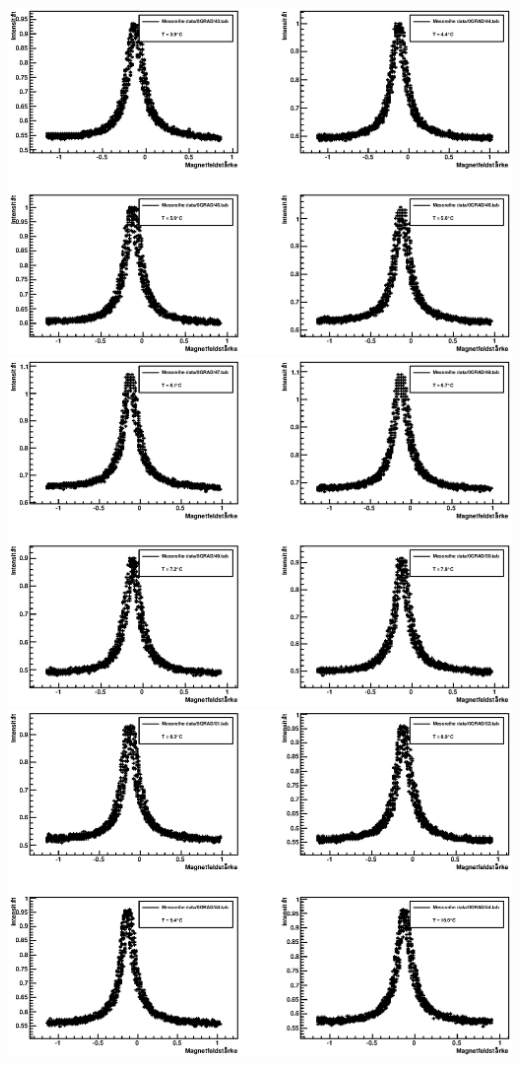 \documentclass[12pt]{article}
\begin{document}
\includegraphics[width=1\linewidth]{pictures/16.eps} \\
\includegraphics[width=1\linewidth]{pictures/17.eps} \\
\includegraphics[width=1\linewidth]{pictures/18.eps} \\
\end{document}
